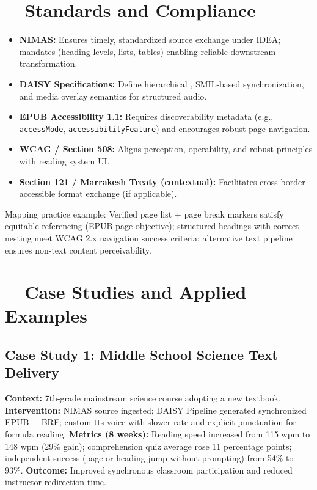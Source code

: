 \section{~~Standards and Compliance}\label{ch07:sec:standards-compliance}
\begin{itemize}
	\item \textbf{NIMAS:} Ensures timely, standardized source exchange under IDEA; mandates 
	      (heading levels, lists, tables) enabling reliable downstream transformation.
	\item \textbf{DAISY Specifications:} Define hierarchical , SMIL-based synchronization,
	      and media overlay semantics for structured audio.
	\item \textbf{EPUB Accessibility 1.1:} Requires discoverability metadata (e.g., \texttt{accessMode},
	      \texttt{accessibilityFeature}) and encourages robust page navigation\supercite{W3CMediaA11y}.
	\item \textbf{WCAG / Section 508:} Aligns perception, operability, and robust principles with reading system UI.
	\item \textbf{Section 121 / Marrakesh Treaty (contextual):} Facilitates cross-border accessible format exchange (if applicable).
\end{itemize}

Mapping practice example: Verified page list + page break markers satisfy equitable referencing (EPUB page  objective);
structured headings with correct nesting meet WCAG 2.x navigation success criteria; alternative text pipeline ensures
non-text content perceivability.

\section{~~Case Studies and Applied Examples}\label{ch07:sec:case-studies}
\subsection{Case Study 1: Middle School Science Text Delivery}
\textbf{Context:} 7th-grade mainstream science course adopting a new textbook.
\textbf{Intervention:} NIMAS source ingested; DAISY Pipeline generated synchronized EPUB + BRF; custom \gls{tts} voice with slower rate and
explicit punctuation for formula reading.
\textbf{Metrics (8 weeks):} Reading speed increased from 115 wpm to 148 wpm (29\% gain); comprehension quiz average rose 11 percentage points;
independent  success (page or heading jump without prompting) from 54\% to 93\%.
\textbf{Outcome:} Improved synchronous classroom participation and reduced instructor redirection time.


